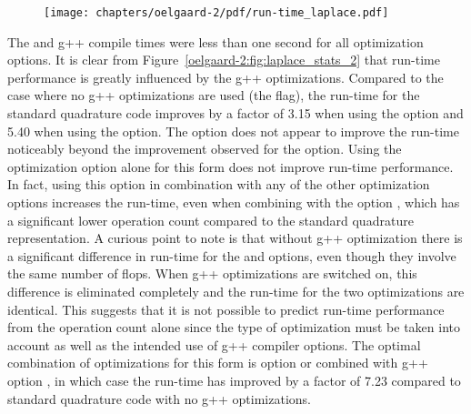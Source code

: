 \begin{figure}
  {\center\texttt{[image: chapters/oelgaard-2/pdf/run-time\_laplace.pdf]}}
\end{figure}

The \ffc{} and g++ compile times were less than one second for all
optimization options.  It is clear from
Figure~\ref{oelgaard-2:fig:laplace_stats_2} that run-time performance
is greatly influenced by the g++ optimizations.  Compared to the case
where no g++ optimizations are used (the  flag), the run-time
for the standard quadrature code improves by a factor of 3.15 when
using the  option and 5.40 when using the  option.  The  option does not appear to
improve the run-time noticeably beyond the improvement observed for the
 option.  Using the \ffc{} optimization option
 alone for this form does not improve run-time performance.
In fact, using this option in combination with any of the other
optimization options increases the run-time, even when combining with
the option , which has a significant lower operation
count compared to the standard quadrature representation.  A curious
point to note is that without g++ optimization there is a significant
difference in run-time for the  and  options, even
though they involve the same number of flops.  When g++ optimizations
are switched on, this difference is eliminated completely and the
run-time for the two \ffc{} optimizations are identical.  This suggests
that it is not possible to predict run-time performance from the
operation count alone since the type of \ffc{} optimization must be
taken into account as well as the intended use of g++ compiler
options.  The optimal combination of optimizations for this form is
\ffc{} option  or  combined with g++ option
, in which case the run-time has improved by a
factor of 7.23 compared to standard quadrature code with no g++
optimizations.

